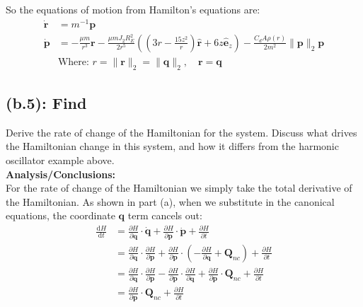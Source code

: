 \documentclass[titlepage]{article}
\begin{document}
\begin{mdframed}[linewidth=1pt, innertopmargin=10pt, innerbottommargin=10pt]
	So the equations of motion from Hamilton's equations are:
	\begin{equation}
		\begin{split}
			\dot{\boldsymbol{r}}&=m^{-1}\boldsymbol{p} \\
			\dot{\boldsymbol{p}}&=-\frac{\mu m}{r^3}\boldsymbol{r}-\frac{\mu mJ_2R_E^2}{2r^5}\left(\left(3r-\frac{15z^2}{r}\right)\hat{\boldsymbol{r}}+6z\hat{\boldsymbol{e}}_z\right)-\frac{C_dA\rho(r)}{2m^2}\|\boldsymbol{p}\|_2\boldsymbol{p} \\
			&\text{Where: }r=\|\boldsymbol{r}\|_2=\|\boldsymbol{q}\|_2,\quad\boldsymbol{r}=\boldsymbol{q}
		\end{split}
	\end{equation}
\end{mdframed}

\subsection*{(b.5): Find}

Derive the rate of change of the Hamiltonian for the system. Discuss what drives the Hamiltonian change in this system, and how it differs from the harmonic oscillator example above. \\

\textbf{Analysis/Conclusions:}\\

For the rate of change of the Hamiltonian we simply take the total derivative of the Hamiltonian. As shown in part (a), when we substitute in the canonical equations, the coordinate $\boldsymbol{q}$ term cancels out:
\begin{equation}
	\begin{split}
		\frac{\mathrm{d}H}{\mathrm{d}t}&=\frac{\partial H}{\partial\boldsymbol{q}}\cdot\dot{\boldsymbol{q}}+\frac{\partial H}{\partial\boldsymbol{p}}\cdot\dot{\boldsymbol{p}}+\frac{\partial H}{\partial t} \\
		&=\frac{\partial H}{\partial\boldsymbol{q}}\cdot\frac{\partial H}{\partial\boldsymbol{p}}+\frac{\partial H}{\partial\boldsymbol{p}}\cdot\left(-\frac{\partial H}{\partial\boldsymbol{q}}+\boldsymbol{Q}_{nc}\right)+\frac{\partial H}{\partial t} \\
		&=\frac{\partial H}{\partial\boldsymbol{q}}\cdot\frac{\partial H}{\partial\boldsymbol{p}}-\frac{\partial H}{\partial\boldsymbol{p}}\cdot\frac{\partial H}{\partial\boldsymbol{q}}+\frac{\partial H}{\partial\boldsymbol{p}}\cdot\boldsymbol{Q}_{nc}+\frac{\partial H}{\partial t} \\
		&=\frac{\partial H}{\partial\boldsymbol{p}}\cdot\boldsymbol{Q}_{nc}+\frac{\partial H}{\partial t}
	\end{split}
	\label{eq:hamiltonrate}
\end{equation}
\end{document}
